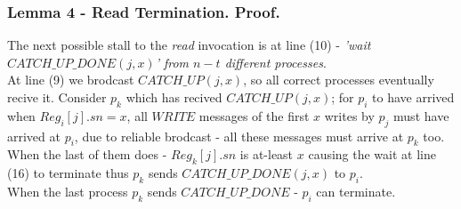 \begin{frame}
    \frametitle{Lemma 4 - Read Termination. Proof.}
    The next possible stall to the \emph{read} invocation is at line (10) -
    \emph{'wait $CATCH\_UP\_DONE(j,x)$' from $n-t$ different processes}.\\
    At line (9) we brodcast $CATCH\_UP(j,x)$, so all correct processes
    eventually recive it. Consider $p_k$ which has recived $CATCH\_UP(j,x)$;
    for $p_i$ to have arrived when $Reg_i[j].sn=x$, all $WRITE$ messages 
    of the first $x$ writes by $p_j$ must have arrived at $p_i$, due to reliable
    brodcast - all these messages must arrive at $p_k$ too. When the last of them does - 
    $Reg_k[j].sn$ is at-least $x$ causing the wait at line (16) to terminate thus
    $p_k$ sends $CATCH\_UP\_DONE(j,x)$ to $p_i$.\\
    When the last process $p_k$ sends $CATCH\_UP\_DONE$ - $p_i$ can terminate.
\end{frame}

